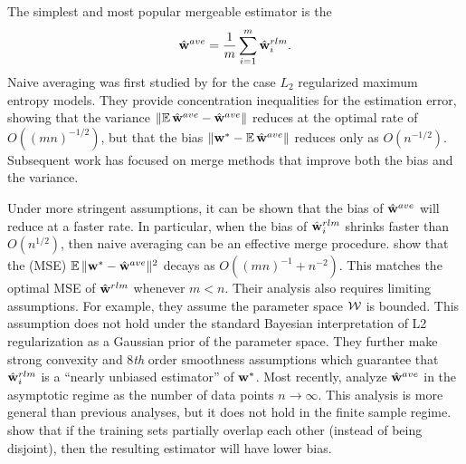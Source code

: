 \documentclass[thesis.tex]{subfiles}
\begin{document}

The simplest and most popular mergeable estimator is the 
\begin{equation}
\hat{\mathbf w}^{ave} = \frac{1}{m}\sum_{i=1}^m \hat{\mathbf w}^{rlm}_i
.
\end{equation}
Naive averaging was first studied by \citet{mcdonald2009efficient} for the case $L_2$ regularized maximum entropy models.
They provide concentration inequalities for the estimation error,
showing that the variance ${\lVert {\operatorname*{\mathbb E}\hat{\mathbf w}^{ave}-\hat{\mathbf w}^{ave}} \rVert}$ reduces at the optimal rate of $O((mn)^{-1/2})$,
but that the bias ${\lVert {{\mathbf w^{*}}-\operatorname*{\mathbb E}\hat{\mathbf w}^{ave}} \rVert}$ reduces only as $O(n^{-1/2})$.
Subsequent work has focused on merge methods that improve both the bias and the variance.

Under more stringent assumptions,
it can be shown that the bias of $\hat{\mathbf w}^{ave}$ will reduce at a faster rate.
In particular, when the bias of $\hat{\mathbf w}^{rlm}_i$ shrinks faster than $O(n^{1/2})$,
then naive averaging can be an effective merge procedure.
\citet{zhang2012communication} show that the  (MSE) $\operatorname*{\mathbb E}{\lVert {{\mathbf w^{*}}-\hat{\mathbf w}^{ave}} \rVert}{}^2$ decays as $O((mn)^{-1} + n^{-2})$.
This matches the optimal MSE of $\hat{\mathbf w}^{rlm}$ whenever $m<n$.
Their analysis also requires limiting assumptions.
For example, they assume the parameter space ${\mathcal W}$ is bounded.
This assumption does not hold under the standard Bayesian interpretation of L2 regularization as a Gaussian prior of the parameter space.
They further make strong convexity and 8\emph{th} order smoothness assumptions which guarantee that $\hat{\mathbf w}^{rlm}_i$ is a ``nearly unbiased estimator'' of ${\mathbf w^{*}}$.
Most recently, \citet{rosenblatt2016optimality} analyze $\hat{\mathbf w}^{ave}$ in the asymptotic regime as the number of data points $n\to\infty$.
This analysis is more general than previous analyses, but it does not hold in the finite sample regime.
\citet{zinkevich2010parallelized} show that if the training sets partially overlap each other (instead of being disjoint), then the resulting estimator will have lower bias.
\end{document}
